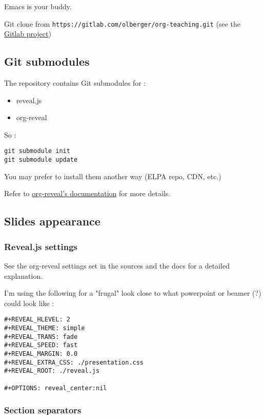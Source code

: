 \documentclass[a4paper]{article}
\begin{document}
Emacs is your buddy.

Git clone from \texttt{https://gitlab.com/olberger/org-teaching.git} (see the \href{https://gitlab.com/olberger/org-teaching}{Gitlab project})

\subsection{Git submodules}
\label{sec:org63fbe85}

The repository contains Git submodules for :
\begin{itemize}
\item reveal.js
\item org-reveal
\end{itemize}

So :
\begin{verbatim}
git submodule init
git submodule update
\end{verbatim}
You may prefer to install them another way (ELPA repo, CDN, etc.)

\begin{NOTES}
Refer to \href{https://github.com/yjwen/org-reveal/#requirements-and-installation}{org-reveal's documentation} for more details.
\end{NOTES}

\subsection{Slides appearance}
\label{sec:org02c65d9}

\subsubsection{Reveal.js settings}
\label{sec:orge76d4e8}

See the org-reveal settings set in the sources and the docs for a detailed explanation.

I'm using the following for a "frugal" look close to what
powerpoint or beamer (?) could look like :

\begin{verbatim}
#+REVEAL_HLEVEL: 2
#+REVEAL_THEME: simple
#+REVEAL_TRANS: fade
#+REVEAL_SPEED: fast
#+REVEAL_MARGIN: 0.0
#+REVEAL_EXTRA_CSS: ./presentation.css
#+REVEAL_ROOT: ./reveal.js

#+OPTIONS: reveal_center:nil
\end{verbatim}

\subsubsection{Section separators}
\label{sec:orgff9c296}
\end{document}
